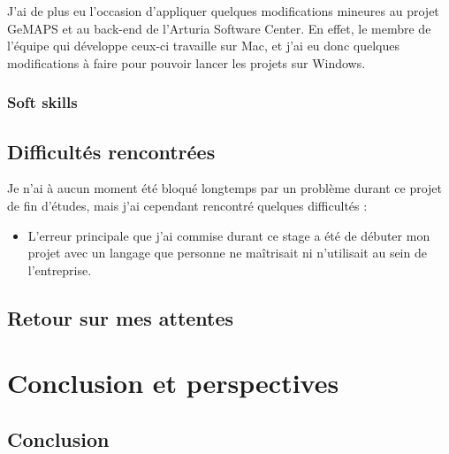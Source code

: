\documentclass[francais]{rapportPFE}  %
\begin{document}
J'ai de plus eu l'occasion d'appliquer quelques modifications mineures au projet GeMAPS et au back-end de l'Arturia Software Center. En effet, le membre de l'équipe qui développe ceux-ci travaille sur Mac, et j'ai eu donc quelques modifications à faire pour pouvoir lancer les projets sur Windows.




\subsubsection{Soft skills}
\subsection{Difficultés rencontrées}
Je n'ai à aucun moment été bloqué longtemps par un problème durant ce projet de fin d'études, mais j'ai cependant rencontré quelques difficultés : 
\begin{itemize}
    \item L'erreur principale que j'ai commise durant ce stage a été de débuter mon projet avec un langage que personne ne maîtrisait ni n'utilisait au sein de l'entreprise.
\end{itemize}
% 

\subsection{Retour sur mes attentes}



\section{Conclusion et perspectives}
\subsection{Conclusion}
\end{document}
